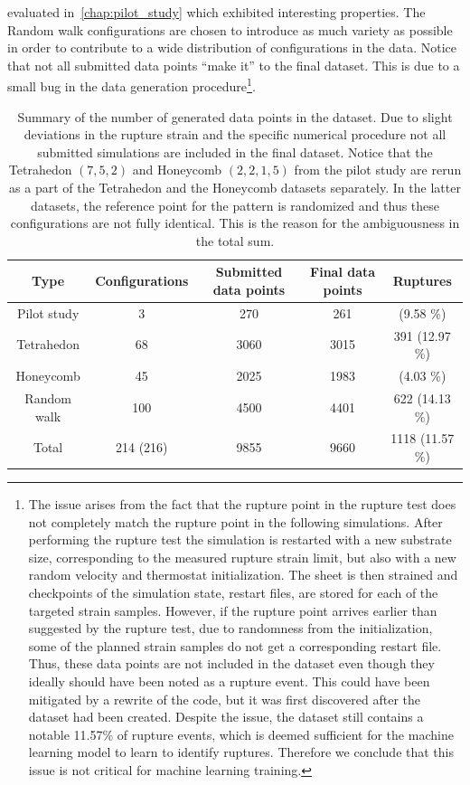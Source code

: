 evaluated in~\cref{chap:pilot_study} which exhibited interesting properties. The
Random walk configurations are chosen to introduce as much
variety as possible in order to contribute to a wide distribution of configurations in the data. Notice that not all
submitted data points ``make it'' to the final dataset. This is due to a small
bug in the data generation procedure\footnote{The issue arises from the fact
that the rupture point in the rupture test does not completely match the rupture
point in the following simulations. After performing the rupture test the
simulation is restarted with a new substrate size, corresponding to the measured
rupture strain limit, but also with a new random velocity and thermostat
initialization. The sheet is then strained and checkpoints of the simulation
state, restart files, are stored for each of the targeted strain samples.
However, if the rupture point arrives earlier than suggested by the rupture
test, due to randomness from the initialization, some of the planned strain
samples do not get a corresponding restart file. Thus, these data points are
not included in the dataset even though they ideally should have been noted as a
rupture event. This could have been mitigated by a rewrite of the code, but it
was first discovered after the dataset had been created. Despite the issue, the
dataset still contains a notable 11.57\% of rupture events, which is deemed
sufficient for the machine learning model to learn to identify ruptures.
Therefore we conclude that this issue is not critical for machine learning
training.}.


\begin{table}[!htb]
  \begin{center}
  \caption{Summary of the number of generated data points in the dataset. Due to slight deviations in the rupture strain and the specific numerical procedure not all submitted simulations are included in the final dataset. Notice that the Tetrahedon $(7, 5, 2)$ and Honeycomb $(2, 2, 1, 5)$ from the pilot study are rerun as a part of the Tetrahedon and the Honeycomb datasets separately. In the latter datasets, the reference point for the pattern is randomized and thus these configurations are not fully identical. This is the reason for the ambiguousness in the total sum.}
  \label{tab:dataset_summary}
  \begin{tabular}{ | c | c | c | c | c |} \hline
  \textbf{Type} & \textbf{Configurations} & \textbf{Submitted data points} & \textbf{Final data points} & \textbf{Ruptures} \\ \hline
  Pilot study & 3 & 270 & 261 & \: 25 \: (9.58 \%)\\ \hline
  Tetrahedon & 68 & 3060 & 3015 & 391 (12.97 \%)\\ \hline
  Honeycomb & 45 & 2025 & 1983 & \: 80 \: (4.03 \%)\\ \hline
  Random walk & 100 & 4500 & 4401 & 622 (14.13 \%) \\ \Xhline{2\arrayrulewidth}
  Total & 214 (216) & 9855 & 9660 & 1118 (11.57 \%) \\ \hline
  \end{tabular}
  \end{center}
\end{table}


